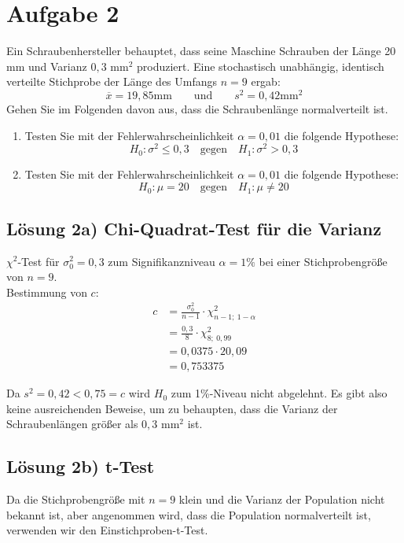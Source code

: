 \documentclass[main.tex]{subfiles}
\begin{document}
\section{Aufgabe 2}
Ein Schraubenhersteller behauptet, dass seine Maschine Schrauben der Länge 20 mm und Varianz $0,3$ mm$^2$ produziert. Eine stochastisch unabhängig, identisch verteilte Stichprobe der Länge des Umfangs $n=9$ ergab:
$$
\overline{x} = 19,85 \text{mm}
\qquad \text{und} \qquad
s^2 = 0,42 \text{mm}^2
$$
Gehen Sie im Folgenden davon aus, dass die Schraubenlänge normalverteilt ist.
\begin{enumerate}
\item Testen Sie mit der Fehlerwahrscheinlichkeit $\alpha = 0,01$ die folgende Hypothese:
$$ H_0: \sigma^2 \leq 0,3 \quad \mbox{gegen} \quad H_1: \sigma^2 > 0,3 $$
\item Testen Sie mit der Fehlerwahrscheinlichkeit $\alpha = 0,01$ die folgende Hypothese:
$$ H_0: \mu = 20 \quad \mbox{gegen} \quad H_1: \mu \neq 20 $$
\end{enumerate}

\subsection{Lösung 2a) Chi-Quadrat-Test für die Varianz}
$\chi^2$-Test für $\sigma_0^2 = 0,3$ zum Signifikanzniveau $\alpha = 1\%$ bei einer Stichprobengröße von $n=9$.\\

Bestimmung von $c$:
$$\begin{aligned}
    c &= \frac{\sigma_0^2}{n-1} \cdot \chi^2_{n-1;\ 1-\alpha} \\
    &= \frac{0,3}{8} \cdot \chi^2_{8;\ 0,99} \\
    &= 0,0375 \cdot 20,09 \\
    &= 0,753375
\end{aligned}$$

Da $s^2 = 0,42 < 0,75 = c$ wird $H_0$ zum 1\%-Niveau nicht abgelehnt. Es gibt also keine ausreichenden Beweise, um zu behaupten, dass die Varianz der Schraubenlängen größer als $0,3$ mm$^2$ ist.


\subsection{Lösung 2b) t-Test}
Da die Stichprobengröße mit $n = 9$ klein und die Varianz der Population nicht bekannt ist, aber angenommen wird, dass die Population normalverteilt ist, verwenden wir den Einstichproben-t-Test.\\
\end{document}
